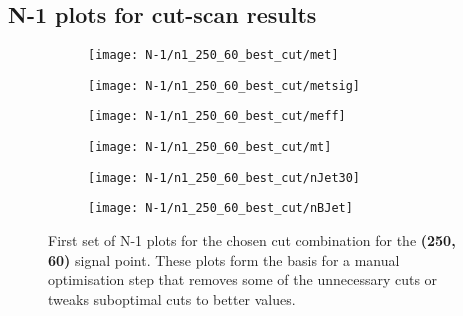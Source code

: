 
\chapter{}
\section{N-1 plots for cut-scan results}\label{app:n-1_plots_cut_opt}

\ifpdf
\graphicspath{{chapter-optimisation/Figs/Raster/}{chapter-electroweak/Figs/PDF/}{chapter-optimisation/Figs/}}
\else
\graphicspath{{chapter-optimisation/Figs/Vector/}{chapter-electroweak/Figs/}}
\fi

\begin{figure}
	\centering
	\begin{subfigure}[b]{0.5\linewidth}
		\centering\texttt{[image: N-1/n1\_250\_60\_best\_cut/met]}
		\caption{\label{fig:result_250_60_met}}
	\end{subfigure}%
	\begin{subfigure}[b]{0.5\linewidth}
		\centering\texttt{[image: N-1/n1\_250\_60\_best\_cut/metsig]}
		\caption{\label{fig:result_250_60_metsig}}
	\end{subfigure}
	\begin{subfigure}[b]{0.5\linewidth}
		\centering\texttt{[image: N-1/n1\_250\_60\_best\_cut/meff]}
		\caption{\label{fig:result_250_60_meff}}
	\end{subfigure}%
	\begin{subfigure}[b]{0.5\linewidth}
		\centering\texttt{[image: N-1/n1\_250\_60\_best\_cut/mt]}
		\caption{\label{fig:result_250_60_mt}}
	\end{subfigure}
	\begin{subfigure}[b]{0.5\linewidth}
		\centering\texttt{[image: N-1/n1\_250\_60\_best\_cut/nJet30]}
		\caption{\label{fig:result_250_60_njet}}
	\end{subfigure}%
	\begin{subfigure}[b]{0.5\linewidth}
		\centering\texttt{[image: N-1/n1\_250\_60\_best\_cut/nBJet]}
		\caption{\label{fig:result_250_60_nbjet}}
	\end{subfigure}
	\caption[N-1 plots for the chosen cut combination for the (250,60) signal point, 1/2]{First set of N-1 plots for the chosen cut combination for the \textbf{(250, 60)} signal point. These plots form the basis for a manual optimisation step that removes some of the unnecessary cuts or tweaks suboptimal cuts to better values.}
	\label{fig:results_250_60_n-1_1}
\end{figure}

